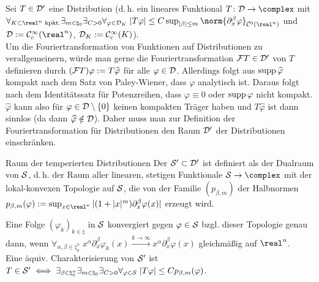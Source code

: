 \begin{Bem}
    Sei $T \in \D'$ eine Distribution
    (d.\,h. ein lineares Funktional $T\colon \D \rightarrow \complex$ mit\\
    $\forall_{K \subset \real^n \text{ kpkt.}} \exists_{m \in \natural_0}
    \exists_{C > 0} \forall_{\varphi \in \D_K}\;
    |T\varphi| \le C \sup_{|\beta| \le m} \norm{\partial_x^\beta \varphi}_{\C^0(\real^n)}$
    und $\D := \C^\infty_c(\real^n)$, $\D_K := \C^\infty_c(K)$).\\
    Um die Fouriertransformation von Funktionen auf Distributionen zu verallgemeinern,
    würde man gerne die Fouriertransformation $\F T \in \D'$ von $T$ definieren durch
    $(\F T)\varphi := T \widehat{\varphi}$ für alle $\varphi \in \D$.
    Allerdings folgt aus $\supp \widehat{\varphi}$ kompakt
    nach dem Satz von Paley-Wiener, dass $\varphi$ analytisch ist.
    Daraus folgt nach dem Identitätssatz für Potenzreihen, dass $\varphi \equiv 0$ oder
    $\supp \varphi$ nicht kompakt.
    $\widehat{\varphi}$ kann also für $\varphi \in \D \setminus \{0\}$ keinen kompakten Träger
    haben und $T\widehat{\varphi}$ ist dann sinnlos (da dann $\widehat{\varphi} \notin \D$).
    Daher muss man zur Definition der Fouriertransformation für Distributionen den Raum
    $\D'$ der Distributionen einschränken.
\end{Bem}

\begin{Def}{Raum der temperierten Distributionen}
    Der  $\S' \subset \D'$ ist
    definiert als der Dualraum von $\S$,
    d.\,h. der Raum aller linearen, stetigen Funktionale $\S \rightarrow \complex$ mit
    der lokal-konvexen Topologie auf $\S$, die von der Familie $(p_{\beta,m})$ der Halbnormen
    $p_{\beta,m}(\varphi) := \sup_{x \in \real^n} |(1 + |x|^m) \partial_x^\beta \varphi(x)|$
    erzeugt wird.
\end{Def}

\begin{Bem}
    Eine Folge $(\varphi_k)_{k \in \natural}$ in $\S$ konvergiert gegen $\varphi \in \S$
    bzgl. dieser Topologie genau dann, wenn
    $\forall_{\alpha, \beta \in \natural_0^n}\; x^\alpha \partial_x^\beta \varphi_k(x)
    \xrightarrow{k \to \infty} x^\alpha \partial_x^\beta \varphi(x)$
    gleichmäßig auf $\real^n$.\\
    Eine äquiv. Charakterisierung von $\S'$ ist
    $T \in \S' \iff \exists_{\beta \in \natural_0^n} \exists_{m \in \natural_0}
    \exists_{C > 0} \forall_{\varphi \in \S}\; |T\varphi| \le C p_{\beta,m}(\varphi)$.
\end{Bem}

